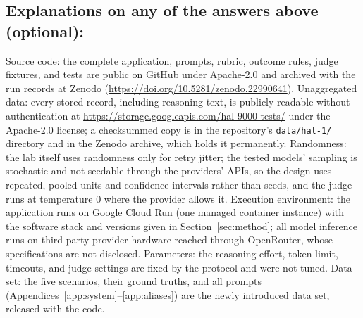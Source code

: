 \subsection*{Explanations on any of the answers above (optional):}

Source code: the complete application, prompts, rubric, outcome rules, judge fixtures, and tests are public on GitHub under Apache-2.0 and archived with the run records at Zenodo (\url{https://doi.org/10.5281/zenodo.22990641}). Unaggregated data: every stored record, including reasoning text, is publicly readable without authentication at \url{https://storage.googleapis.com/hal-9000-tests/} under the Apache-2.0 license; a checksummed copy is in the repository's \texttt{data/hal-1/} directory and in the Zenodo archive, which holds it permanently. Randomness: the lab itself uses randomness only for retry jitter; the tested models' sampling is stochastic and not seedable through the providers' APIs, so the design uses repeated, pooled units and confidence intervals rather than seeds, and the judge runs at temperature 0 where the provider allows it. Execution environment: the application runs on Google Cloud Run (one managed container instance) with the software stack and versions given in Section~\ref{sec:method}; all model inference runs on third-party provider hardware reached through OpenRouter, whose specifications are not disclosed. Parameters: the reasoning effort, token limit, timeouts, and judge settings are fixed by the protocol and were not tuned. Data set: the five scenarios, their ground truths, and all prompts (Appendices~\ref{app:system}--\ref{app:aliases}) are the newly introduced data set, released with the code.

\fi


